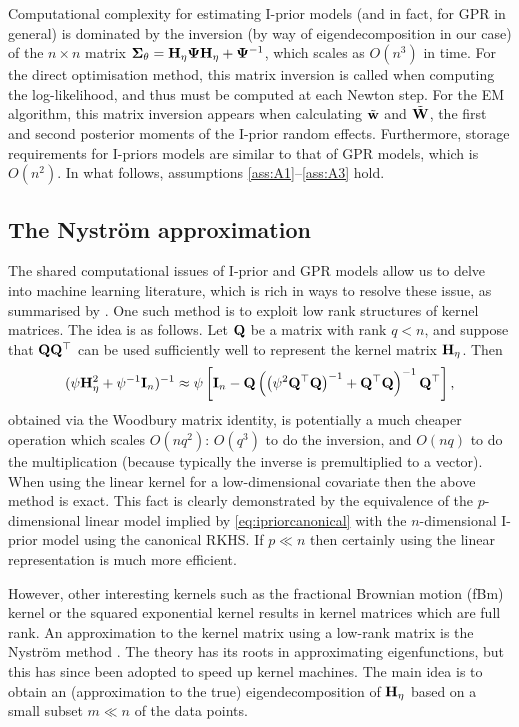 Computational complexity for estimating I-prior models (and in fact, for GPR in general) is dominated by the inversion (by way of eigendecomposition in our case) of the $n \times n$ matrix ${\bm\Sigma}_\theta = {\mathbf H}_\eta{\bm\Psi}{\mathbf H}_\eta + {\bm\Psi}^{-1}$, which scales as $O(n^3)$ in time.
For the direct optimisation method, this matrix inversion is called when computing the log-likelihood, and thus must be computed at each Newton step.
For the EM algorithm, this matrix inversion appears when calculating $\tilde {{\mathbf w}}$ and $\tilde {{\mathbf W}}$, the first and second posterior moments of the I-prior random effects.
Furthermore, storage requirements for I-priors models are similar to that of GPR models, which is $O(n^2)$.
In what follows, assumptions \ref{ass:A1}--\ref{ass:A3} hold.

\subsection[The Nystrom approximation]{The Nyström approximation}

The shared computational issues of I-prior and GPR models allow us to delve into machine learning literature, which is rich in ways to resolve these issue, as summarised by \citet{quinonero2005unifying}.
One such method is to exploit low rank structures of kernel matrices.
The idea is as follows.
Let ${\mathbf Q}$ be a matrix with rank $q < n$, and suppose that ${\mathbf Q}{\mathbf Q}^\top$ can be used sufficiently well to represent the kernel matrix ${\mathbf H}_\eta$.
Then
%
\[
  (\psi{\mathbf H}_\eta^2 + \psi^{-1}{\mathbf I}_n)^{-1} \approx
  \psi\left[
  {\mathbf I}_n -
  {\mathbf Q}\left( \big(\psi^2{\mathbf Q}^\top{\mathbf Q}\big)^{-1} +{\mathbf Q}^\top{\mathbf Q} \right)^{-1} {\mathbf Q}^\top
  \right],
\]
%
obtained via the Woodbury matrix identity, is potentially a much cheaper operation which scales $O(nq^2)$: $O(q^3)$ to do the inversion, and $O(nq)$ to do the multiplication (because typically the inverse is premultiplied to a vector).
When using the linear kernel for a low-dimensional covariate then the above method is exact.
This fact is clearly demonstrated by the equivalence of the $p$-dimensional linear model implied by \cref{eq:ipriorcanonical} with the $n$-dimensional I-prior model using the canonical RKHS.
If $p \ll n$ then certainly using the linear representation is much more efficient.

However, other interesting kernels such as the fractional Brownian motion (fBm) kernel or the squared exponential kernel results in kernel matrices which are full rank.
An approximation to the kernel matrix using a low-rank matrix is the Nystr\"om method \citep{williams2001using}.
The theory has its roots in approximating eigenfunctions, but this has since been adopted to speed up kernel machines.
The main idea is to obtain an (approximation to the true) eigendecomposition of ${\mathbf H}_\eta$ based on a small subset $m \ll n$ of the data points.


